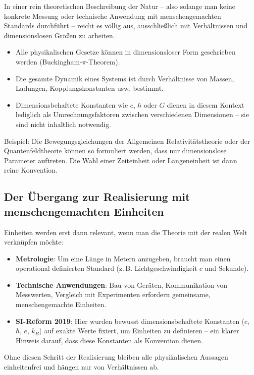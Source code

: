 In einer rein theoretischen Beschreibung der Natur – also solange man keine konkrete Messung oder technische Anwendung mit menschengemachten Standards durchführt – reicht es völlig aus, ausschließlich mit Verhältnissen und dimensionslosen Größen zu arbeiten.

\begin{itemize}
	\item Alle physikalischen Gesetze können in dimensionsloser Form geschrieben werden (Buckingham-$\pi$-Theorem).
	\item Die gesamte Dynamik eines Systems ist durch Verhältnisse von Massen, Ladungen, Kopplungskonstanten usw. bestimmt.
	\item Dimensionsbehaftete Konstanten wie $c$, $\hbar$ oder $G$ dienen in diesem Kontext lediglich als Umrechnungsfaktoren zwischen verschiedenen Dimensionen – sie sind nicht inhaltlich notwendig.
\end{itemize}

Beispiel: Die Bewegungsgleichungen der Allgemeinen Relativitätstheorie oder der Quantenfeldtheorie können so formuliert werden, dass nur dimensionslose Parameter auftreten. Die Wahl einer Zeiteinheit oder Längeneinheit ist dann reine Konvention.

\subsection{Der Übergang zur Realisierung mit menschengemachten Einheiten}

Einheiten werden erst dann relevant, wenn man die Theorie mit der realen Welt verknüpfen möchte:

\begin{itemize}
	\item \textbf{Metrologie}: Um eine Länge in Metern anzugeben, braucht man einen operational definierten Standard (z.\,B. Lichtgeschwindigkeit $c$ und Sekunde).
	\item \textbf{Technische Anwendungen}: Bau von Geräten, Kommunikation von Messwerten, Vergleich mit Experimenten erfordern gemeinsame, menschengemachte Einheiten.
	\item \textbf{SI-Reform 2019}: Hier wurden bewusst dimensionsbehaftete Konstanten ($c$, $\hbar$, $e$, $k_B$) auf exakte Werte fixiert, um Einheiten zu definieren – ein klarer Hinweis darauf, dass diese Konstanten als Konvention dienen.
\end{itemize}

Ohne diesen Schritt der Realisierung bleiben alle physikalischen Aussagen einheitenfrei und hängen nur von Verhältnissen ab.

